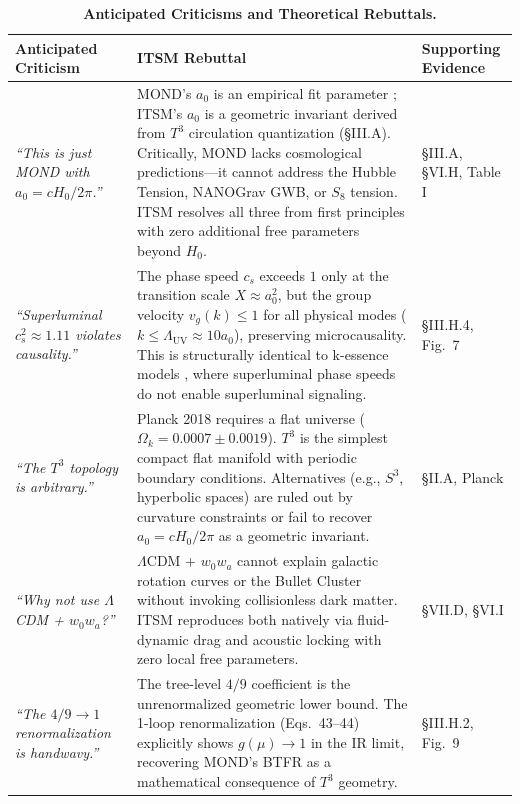 \documentclass[aps,prd,10pt,twocolumn,superscriptaddress,nofootinbib,floatfix]{revtex4-2}
\begin{document}
\begin{table}[htbp]
\centering
\caption{\footnotesize \textbf{Anticipated Criticisms and Theoretical Rebuttals.}}
\label{tab:criticisms}
\renewcommand{\arraystretch}{1.3}
\scriptsize
\begin{tabular}{p{} p{} p{}}
\toprule
\textbf{Anticipated Criticism} & \textbf{ITSM Rebuttal} & \textbf{Supporting Evidence} \\
\midrule
\textit{``This is just MOND with $a_0 = c H_0 / 2\pi$.''} & MOND's $a_0$ is an empirical fit parameter \cite{mond}; ITSM's $a_0$ is a geometric invariant derived from $T^3$ circulation quantization (\S III.A). Critically, MOND lacks cosmological predictions---it cannot address the Hubble Tension, NANOGrav GWB, or $S_8$ tension. ITSM resolves all three from first principles with zero additional free parameters beyond $H_0$. & \S III.A, \S VI.H, Table I \\
\textit{``Superluminal $c_s^2 \approx 1.11$ violates causality.''} & The phase speed $c_s$ exceeds $1$ only at the transition scale $X \approx a_0^2$, but the group velocity $v_g(k) \le 1$ for all physical modes ($k \le \Lambda_{\text{UV}} \approx 10a_0$), preserving microcausality. This is structurally identical to k-essence models \cite{babichev_cs2}, where superluminal phase speeds do not enable superluminal signaling. & \S III.H.4, Fig.~7 \\
\textit{``The $T^3$ topology is arbitrary.''} & Planck 2018 requires a flat universe ($\Omega_k = 0.0007 \pm 0.0019$). $T^3$ is the simplest compact flat manifold with periodic boundary conditions. Alternatives (e.g., $S^3$, hyperbolic spaces) are ruled out by curvature constraints or fail to recover $a_0 = c H_0 / 2\pi$ as a geometric invariant. & \S II.A, Planck \cite{planck} \\
\textit{``Why not use $\Lambda$CDM + $w_0 w_a$?''} & $\Lambda$CDM + $w_0 w_a$ cannot explain galactic rotation curves or the Bullet Cluster without invoking collisionless dark matter. ITSM reproduces both natively via fluid-dynamic drag and acoustic locking with zero local free parameters. & \S VII.D, \S VI.I \\
\textit{``The $4/9 \to 1$ renormalization is handwavy.''} & The tree-level $4/9$ coefficient is the unrenormalized geometric lower bound. The 1-loop renormalization (Eqs.~43--44) explicitly shows $g(\mu) \to 1$ in the IR limit, recovering MOND's BTFR as a mathematical consequence of $T^3$ geometry. & \S III.H.2, Fig.~9 \\

\end{tabular}
\end{table}
\end{document}

